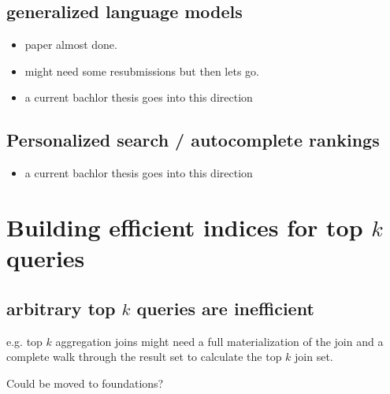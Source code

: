 \documentclass[•]{book}
\begin{document}
\chapter{generalized language models}
\begin{itemize}
\item paper almost done. 
\item might need some resubmissions but then lets go.
\item a current bachlor thesis goes into this direction
\end{itemize}

\chapter{Personalized search / autocomplete rankings}
\begin{itemize}
\item a current bachlor thesis goes into this direction
\end {itemize}


\part{Building efficient indices for top $k$ queries}
\chapter{arbitrary top $k$ queries are inefficient}
e.g. top $k$ aggregation joins might need a full materialization of the join and a complete walk through the result set to calculate the top $k$ join set. 

Could be moved to foundations?
\end{document}
